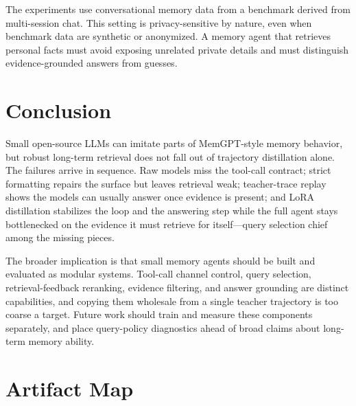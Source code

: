 \documentclass[11pt]{article}
\begin{document}
The experiments use conversational memory data from a benchmark derived from multi-session chat. This setting is privacy-sensitive by nature, even when benchmark data are synthetic or anonymized. A memory agent that retrieves personal facts must avoid exposing unrelated private details and must distinguish evidence-grounded answers from guesses.

\section{Conclusion}

Small open-source LLMs can imitate parts of MemGPT-style memory behavior, but robust long-term retrieval does not fall out of trajectory distillation alone. The failures arrive in sequence. Raw models miss the tool-call contract; strict formatting repairs the surface but leaves retrieval weak; teacher-trace replay shows the models can usually answer once evidence is present; and LoRA distillation stabilizes the loop and the answering step while the full agent stays bottlenecked on the evidence it must retrieve for itself---query selection chief among the missing pieces.

The broader implication is that small memory agents should be built and evaluated as modular systems. Tool-call channel control, query selection, retrieval-feedback reranking, evidence filtering, and answer grounding are distinct capabilities, and copying them wholesale from a single teacher trajectory is too coarse a target. Future work should train and measure these components separately, and place query-policy diagnostics ahead of broad claims about long-term memory ability.



\appendix
\section{Artifact Map}
\end{document}
